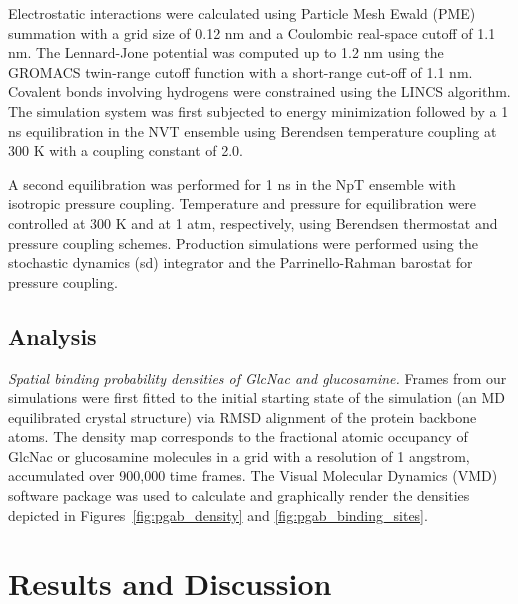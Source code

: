 Electrostatic interactions were calculated using Particle Mesh Ewald (PME) summation with a grid size of 0.12 nm and a Coulombic real-space cutoff of 1.1 nm. The Lennard-Jone potential was computed up to 1.2 nm using the GROMACS twin-range cutoff function with a short-range cut-off of 1.1 nm. Covalent bonds involving hydrogens were constrained using the LINCS algorithm. The simulation system was first subjected to energy minimization followed by a 1 ns equilibration in the NVT ensemble using Berendsen temperature coupling at 300 K with a coupling constant of 2.0.

A second equilibration was performed for 1 ns in the NpT ensemble with isotropic pressure coupling. Temperature and pressure for equilibration were controlled at 300 K and at 1 atm, respectively, using Berendsen thermostat and pressure coupling schemes. Production simulations were performed using the stochastic dynamics (sd) integrator and the Parrinello-Rahman barostat for pressure coupling.

\subsection{Analysis}
\emph{Spatial binding probability densities of GlcNac and glucosamine.} Frames from our simulations were first fitted to the initial starting state of the simulation (an MD equilibrated crystal structure) via RMSD alignment of the protein backbone atoms. The density map corresponds to the fractional atomic occupancy of GlcNac or glucosamine molecules in a grid with a resolution of 1 angstrom, accumulated over 900,000 time frames. The Visual Molecular Dynamics (VMD) software package was used to calculate and graphically render the densities depicted in Figures~\ref{fig:pgab_density} and \ref{fig:pgab_binding_sites}.


\section{Results and Discussion}


